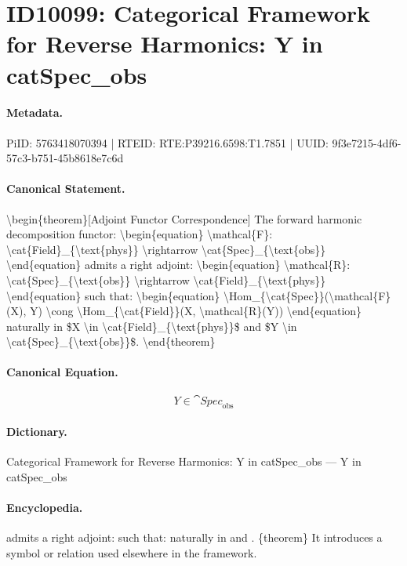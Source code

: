 \section*{ID10099: Categorical Framework for Reverse Harmonics: Y in catSpec\_obs}
\paragraph{Metadata.}
PiID: 5763418070394 | RTEID: RTE:P39216.6598:T1.7851 | UUID: 9f3e7215-4df6-57c3-b751-45b8618e7c6d

\paragraph{Canonical Statement.}
\textbackslash{}begin\{theorem\}[Adjoint Functor Correspondence] The forward harmonic decomposition functor: \textbackslash{}begin\{equation\} \textbackslash{}mathcal\{F\}: \textbackslash{}cat\{Field\}\_\{\textbackslash{}text\{phys\}\} \textbackslash{}rightarrow \textbackslash{}cat\{Spec\}\_\{\textbackslash{}text\{obs\}\} \textbackslash{}end\{equation\} admits a right adjoint: \textbackslash{}begin\{equation\} \textbackslash{}mathcal\{R\}: \textbackslash{}cat\{Spec\}\_\{\textbackslash{}text\{obs\}\} \textbackslash{}rightarrow \textbackslash{}cat\{Field\}\_\{\textbackslash{}text\{phys\}\} \textbackslash{}end\{equation\} such that: \textbackslash{}begin\{equation\} \textbackslash{}Hom\_\{\textbackslash{}cat\{Spec\}\}(\textbackslash{}mathcal\{F\}(X), Y) \textbackslash{}cong \textbackslash{}Hom\_\{\textbackslash{}cat\{Field\}\}(X, \textbackslash{}mathcal\{R\}(Y)) \textbackslash{}end\{equation\} naturally in \$X \textbackslash{}in \textbackslash{}cat\{Field\}\_\{\textbackslash{}text\{phys\}\}\$ and \$Y \textbackslash{}in \textbackslash{}cat\{Spec\}\_\{\textbackslash{}text\{obs\}\}\$. \textbackslash{}end\{theorem\}

\paragraph{Canonical Equation.}
\[
Y \in \cat{Spec}_{\text{obs}}
\]

\paragraph{Dictionary.}
Categorical Framework for Reverse Harmonics: Y in catSpec\_obs — Y in catSpec\_obs

\paragraph{Encyclopedia.}
admits a right adjoint: such that: naturally in and . \{theorem\} It introduces a symbol or relation used elsewhere in the framework.
